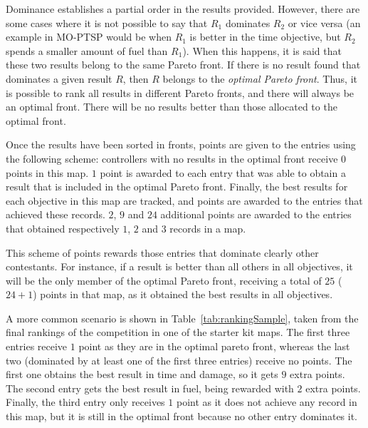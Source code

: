 \documentclass[conference]{IEEEtran}
\begin{document}
Dominance establishes a partial order in the results provided. However, there are some cases where it is not possible to say that $R_1$ dominates $R_2$ or vice versa (an example in MO-PTSP would be when $R_1$ is better in the time objective, but $R_2$ spends a smaller amount of fuel than $R_1$). When this happens, it is said that these two results belong to the same Pareto front. If there is no result found that dominates a given result $R$, then $R$ belongs to the \textit{optimal Pareto front}. Thus, it is possible to rank all results in different Pareto fronts, and there will always be an optimal front. There will be no results better than those allocated to the optimal front. 

Once the results have been sorted in fronts, points are given to the entries using the following scheme: controllers with no results in the optimal front receive $0$ points in this map. $1$ point is awarded to each entry that was able to obtain a result that is included in the optimal Pareto front. Finally, the best results for each objective in this map are tracked, and points are awarded to the entries that achieved these records. $2$, $9$ and $24$ additional points are awarded to the entries that obtained respectively $1$, $2$ and $3$ records in a map.

This scheme of points rewards those entries that dominate clearly other contestants. For instance, if a result is better than all others in all objectives, it will be the only member of the optimal Pareto front, receiving a total of $25$ ($24 + 1$) points in that map, as it obtained the best results in all objectives.

A more common scenario is shown in Table~\ref{tab:rankingSample}, taken from the final rankings of the competition in one of the starter kit maps. The first three entries receive $1$ point as they are in the optimal pareto front, whereas the last two (dominated by at least one of the first three entries) receive no points. The first one obtains the best result in time and damage, so it gets $9$ extra points. The second entry gets the best result in fuel, being rewarded with $2$ extra points. Finally, the third entry only receives $1$ point as it does not achieve any record in this map, but it is still in the optimal front because no other entry dominates it.
\end{document}
